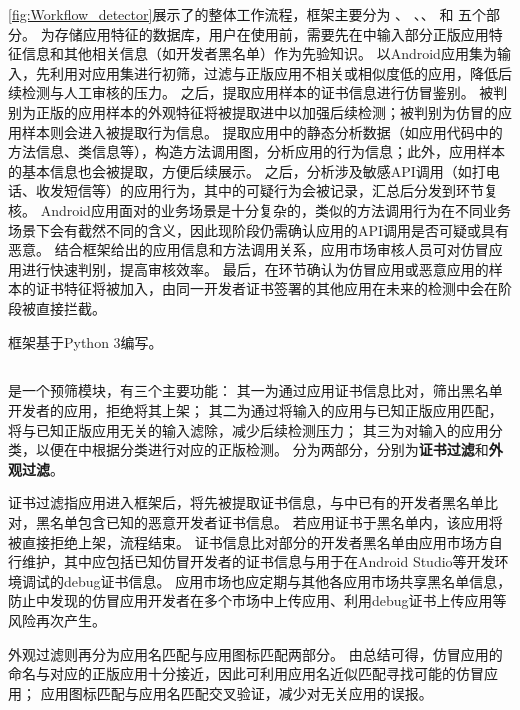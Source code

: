\autoref{fig:Workflow_detector}展示了\mytool 的整体工作流程，框架主要分为\textbf{\componentA} 、\textbf{\componentB} 、\textbf{\componentC}、\textbf{\componentD} 和\textbf{\componentE} 五个部分。
\componentE 为存储应用特征的数据库，用户在使用前，需要先在\componentE 中输入部分正版应用特征信息和其他相关信息（如开发者黑名单）作为先验知识。
\mytool 以Android应用集为输入，先利用\componentA 对应用集进行初筛，过滤与正版应用不相关或相似度低的应用，降低后续检测与人工审核的压力。
之后，\componentB 提取应用样本的证书信息进行仿冒鉴别。
被判别为正版的应用样本的外观特征将被提取进\componentE 中以加强后续检测；被判别为仿冒的应用样本则会进入\componentC 被提取行为信息。
\componentC 提取应用中的静态分析数据（如应用代码中的方法信息、类信息等），构造方法调用图，分析应用的行为信息；此外，应用样本的基本信息也会被提取，方便后续展示。
之后，\componentC 分析涉及敏感API调用（如打电话、收发短信等）的应用行为，其中的可疑行为会被记录，汇总后分发到\componentD 环节复核。
Android应用面对的业务场景是十分复杂的，类似的方法调用行为在不同业务场景下会有截然不同的含义，因此现阶段仍需\componentD 确认应用的API调用是否可疑或具有恶意。
结合框架给出的应用信息和方法调用关系，应用市场审核人员可对仿冒应用进行快速判别，提高审核效率。
最后，在\componentD 环节确认为仿冒应用或恶意应用的样本的证书特征将被加入\componentE ，由同一开发者证书签署的其他应用在未来的检测中会在\componentA 阶段被直接拦截。

框架基于Python 3编写。

\subsection{\componentA }
\componentA 是一个预筛模块，有三个主要功能：
其一为通过应用证书信息比对，筛出黑名单开发者的应用，拒绝将其上架；
其二为通过将输入的应用与已知正版应用匹配，将与已知正版应用无关的输入滤除，减少后续检测压力；
其三为对输入的应用分类，以便在\componentB 中根据分类进行对应的正版检测。
\componentA 分为两部分，分别为\textbf{证书过滤}和\textbf{外观过滤}。

证书过滤指应用进入框架后，将先被提取证书信息，与\componentE 中已有的开发者黑名单比对，黑名单包含已知的恶意开发者证书信息。
若应用证书于黑名单内，该应用将被直接拒绝上架，流程结束。
证书信息比对部分的开发者黑名单由应用市场方自行维护，其中应包括已知仿冒开发者的证书信息与用于在Android Studio等开发环境调试的debug证书信息。
应用市场也应定期与其他各应用市场共享黑名单信息，防止中发现的仿冒应用开发者在多个市场中上传应用、利用debug证书上传应用等风险再次产生。

外观过滤则再分为应用名匹配与应用图标匹配两部分。
由总结可得，仿冒应用的命名与对应的正版应用十分接近，因此可利用应用名近似匹配寻找可能的仿冒应用；
应用图标匹配与应用名匹配交叉验证，减少对无关应用的误报。

